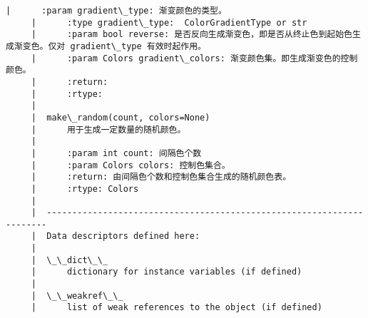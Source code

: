 \documentclass[11pt]{article}
\begin{document}
\begin{Verbatim}[commandchars=\\\{\}]
     |      :param gradient\_type: 渐变颜色的类型。
     |      :type gradient\_type:  ColorGradientType or str
     |      :param bool reverse: 是否反向生成渐变色，即是否从终止色到起始色生成渐变色。仅对 gradient\_type 有效时起作用。
     |      :param Colors gradient\_colors: 渐变颜色集。即生成渐变色的控制颜色。
     |      :return:
     |      :rtype:
     |  
     |  make\_random(count, colors=None)
     |      用于生成一定数量的随机颜色。
     |      
     |      :param int count: 间隔色个数
     |      :param Colors colors: 控制色集合。
     |      :return: 由间隔色个数和控制色集合生成的随机颜色表。
     |      :rtype: Colors
     |  
     |  ----------------------------------------------------------------------
     |  Data descriptors defined here:
     |  
     |  \_\_dict\_\_
     |      dictionary for instance variables (if defined)
     |  
     |  \_\_weakref\_\_
     |      list of weak references to the object (if defined)
    

\end{Verbatim}
\end{document}

